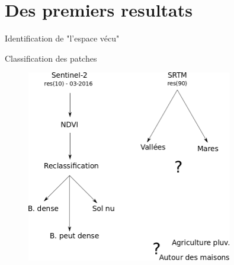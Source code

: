 \documentclass[newPxFont]{beamer}
\begin{document}
\section{Des premiers resultats}

\begin{frame}[c]{Identification de "l'espace vécu"}
\vspace{-1cm}
\begin{figure}
\end{figure}
\end{frame}



\begin{frame}[c]{Classification des patches}
\vspace{-1cm}
\begin{figure}
  \centering
  \includegraphics[width = 0.8\textwidth]{img/process}
\end{figure}

\end{frame}
\end{document}
